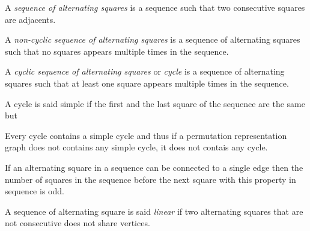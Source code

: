 \begin{definition}
  A \textit{sequence of alternating squares} is a sequence such that two consecutive squares are adjacents.
\end{definition}

\begin{definition}
  A \textit{non-cyclic sequence of alternating squares} is a sequence of alternating squares such that no squares appears multiple times in the sequence.
\end{definition}

\begin{definition}
  A \textit{cyclic sequence of alternating squares} or \textit{cycle} is a sequence of alternating squares such that at least one square appears multiple times in the sequence.
\end{definition}

\begin{definition}
  A cycle is said simple if the first and the last square of the sequence are the same but
\end{definition}

\begin{corollary}
  \label{cycle-simple-cycle}
  Every cycle contains a simple cycle and thus if a permutation representation graph does not contains any simple cycle, it does not contais any cycle.
\end{corollary}

\begin{proposition}
  \label{parity-sequence-squares}
  If an alternating square in a sequence can be connected to a single edge then the number of squares in the sequence before the next square with this property in sequence is odd.
\end{proposition}

\begin{definition}
    A sequence of alternating square is said \textit{linear} if two alternating squares that are not consecutive does not share vertices.
\end{definition}

